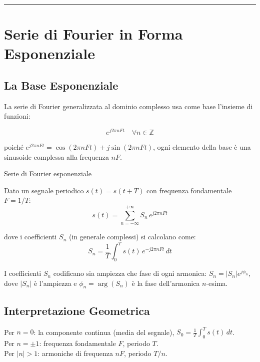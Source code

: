 \documentclass[
  italian,
  openany]{book}
\begin{document}
\begin{center}\rule{0.5\linewidth}{0.5pt}\end{center}

\section{Serie di Fourier in Forma
Esponenziale}\label{serie-di-fourier-in-forma-esponenziale}

\subsection{La Base Esponenziale}\label{la-base-esponenziale}

La serie di Fourier generalizzata al dominio complesso usa come base
l'insieme di funzioni:

\[e^{j2\pi n F t} \quad \forall n \in \mathbb{Z}\]

poiché \(e^{j2\pi n F t} = \cos(2\pi n F t) + j\sin(2\pi n F t)\), ogni
elemento della base è una sinusoide complessa alla frequenza \(nF\).

\begin{calloutdefinition}{Serie di Fourier esponenziale}

Dato un segnale periodico \(s(t) = s(t+T)\) con frequenza fondamentale
\(F = 1/T\):
\[s(t) = \sum_{n=-\infty}^{+\infty} S_n \, e^{j2\pi n F t}\]

dove i coefficienti \(S_n\) (in generale complessi) si calcolano come:
\[S_n = \frac{1}{T} \int_{0}^{T} s(t) \, e^{-j2\pi n F t}\, dt\]

\end{calloutdefinition}

I coefficienti \(S_n\) codificano sia ampiezza che fase di ogni
armonica: \(S_n = |S_n| e^{j\phi_n}\), dove \(|S_n|\) è l'ampiezza e
\(\phi_n = \arg(S_n)\) è la fase dell'armonica \(n\)-esima.

\subsection{Interpretazione
Geometrica}\label{interpretazione-geometrica}

Per \(n = 0\): la componente continua (media del segnale),
\(S_0 = \frac{1}{T}\int_0^T s(t)\, dt\).\\
Per \(n = \pm 1\): frequenza fondamentale \(F\), periodo \(T\).\\
Per \(|n| > 1\): armoniche di frequenza \(nF\), periodo \(T/n\).
\end{document}
